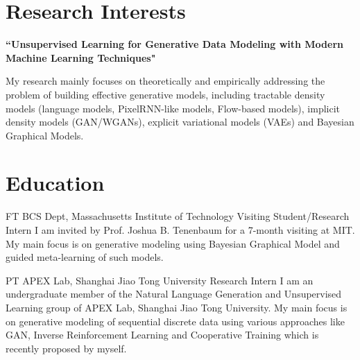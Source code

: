 \documentclass[10pt]{article} %
\begin{document}
\begin{paracol}{2}
\section{Research Interests}

{\raggedright\textbf{``Unsupervised Learning for Generative Data Modeling with Modern Machine Learning Techniques"}\\\medskip}

My research mainly focuses on theoretically and empirically addressing the problem of building effective generative models, including tractable density models (language models, PixelRNN-like models, Flow-based models), implicit density models (GAN/WGANs), explicit variational models (VAEs) and Bayesian Graphical Models.

\medskip %


\section{Education}





{FT} %
{BCS Dept, Massachusetts Institute of Technology} %
{Visiting Student/Research Intern} %
{I am invited by Prof. Joshua B. Tenenbaum for a 7-month visiting at MIT. My main focus is on generative modeling using Bayesian Graphical Model and guided meta-learning of such models.} %


{PT} %
{APEX Lab, Shanghai Jiao Tong University} %
{Research Intern} %
{I am an undergraduate member of the Natural Language Generation and Unsupervised Learning group of APEX Lab, Shanghai Jiao Tong University. My main focus is on generative modeling of sequential discrete data using various approaches like GAN, Inverse Reinforcement Learning and Cooperative Training which is recently proposed by myself.}  %


\end{paracol}
\end{document}
